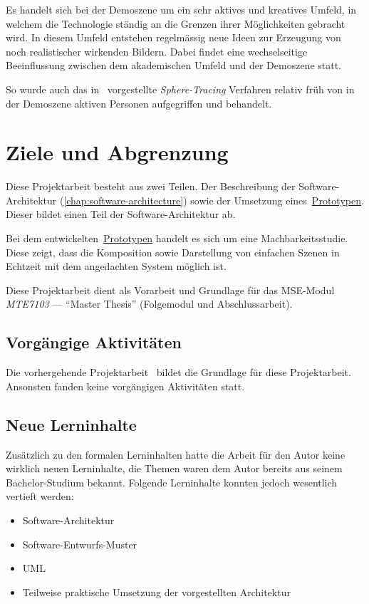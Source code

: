Es handelt sich bei der Demoszene um ein sehr aktives und kreatives
Umfeld, in welchem die Technologie ständig an die Grenzen ihrer
Möglichkeiten gebracht wird. In diesem Umfeld entstehen regelmässig neue
Ideen zur Erzeugung von noch realistischer wirkenden Bildern. Dabei
findet eine wechselseitige Beeinflussung zwischen dem akademischen
Umfeld und der Demoszene statt.

So wurde auch das in~\cite{osterwalder_sven_volume_2016} vorgestellte
\textit{Sphere-Tracing} Verfahren
relativ früh von in der Demoszene aktiven Personen aufgegriffen und
behandelt.

\section{Ziele und Abgrenzung}
\label{sec:objectives}

Diese Projektarbeit besteht aus zwei Teilen. Der Beschreibung der
Software-Architektur (\ref{chap:software-architecture}) sowie der Umsetzung
eines~\hyperref[chap:prototype]{Prototypen}. Dieser bildet einen Teil der
Software-Architektur ab.

Bei dem entwickelten~\hyperref[chap:prototype]{Prototypen} handelt es sich um
eine Machbarkeitsstudie. Diese zeigt, dass die Komposition sowie Darstellung
von einfachen Szenen in Echtzeit mit dem angedachten System möglich ist.

Diese Projektarbeit dient als Vorarbeit und Grundlage für das MSE-Modul
\textit{MTE7103} --- ``Master Thesis'' (Folgemodul und Abschlussarbeit).

\subsection{Vorgängige Aktivitäten}
\label{subsec:preliminaries}

Die vorhergehende Projektarbeit~\cite{osterwalder_sven_volume_2016} bildet die
Grundlage für diese Projektarbeit. Ansonsten fanden keine vorgängigen
Aktivitäten statt.

\subsection{Neue Lerninhalte}
\label{subsec:new_learning_contents}

Zusätzlich zu den formalen Lerninhalten hatte die Arbeit für den Autor
keine wirklich neuen Lerninhalte, die Themen waren dem Autor bereits aus seinem
Bachelor-Studium bekannt. Folgende Lerninhalte konnten jedoch wesentlich
vertieft werden:

\begin{itemize}
    \item{Software-Architektur}
    \item{Software-Entwurfs-Muster}
    \item{UML}
    \item{Teilweise praktische Umsetzung der vorgestellten Architektur}
\end{itemize}

